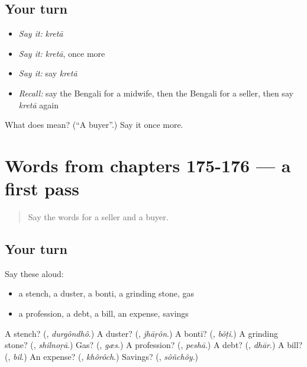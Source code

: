 \subsection*{Your turn}
\begin{itemize}
\raggedright
  \item \emph{Say it:} \emph{kretā}
  \item \emph{Say it:} \emph{kretā}, once more
  \item \emph{Say it:} say \emph{kretā}
  \item \emph{Recall:} say the Bengali for a midwife, then the Bengali for a seller, then say \emph{kretā} again
\end{itemize}

\begin{tcolorbox}[breakable,colback=teal!4,colframe=teal!35!black,title={Before you move on}]
What does  mean? (\textquotedblleft{}A buyer\textquotedblright{}.) Say it once more.
\end{tcolorbox}
\section[(dialogue)]{Words from chapters 175-176 — a first pass}

\label{lesson:BN-R178-first-pass-words-from-chapters-175-176}



\begin{quote}
Say the words for a seller and a buyer.
\end{quote}

\subsection*{Your turn}
Say these aloud:

\begin{itemize}
\raggedright
  \item a stench, a duster, a bonti, a grinding stone, gas
  \item a profession, a debt, a bill, an expense, savings
\end{itemize}

\begin{tcolorbox}[breakable,colback=teal!4,colframe=teal!35!black,title={Before you move on}]
A stench? (\textbf{}, \emph{durgôndhô}.) A duster? (\textbf{}, \emph{jhāṛôn}.) A bonti? (\textbf{}, \emph{bõṭi}.) A grinding stone? (\textbf{}, \emph{shilnoṛā}.) Gas? (\textbf{}, \emph{gæs}.) A profession? (\textbf{}, \emph{peshā}.) A debt? (\textbf{}, \emph{dhār}.) A bill? (\textbf{}, \emph{bil}.) An expense? (\textbf{}, \emph{khôrôch}.) Savings? (\textbf{}, \emph{sôñchôy}.)
\end{tcolorbox}
